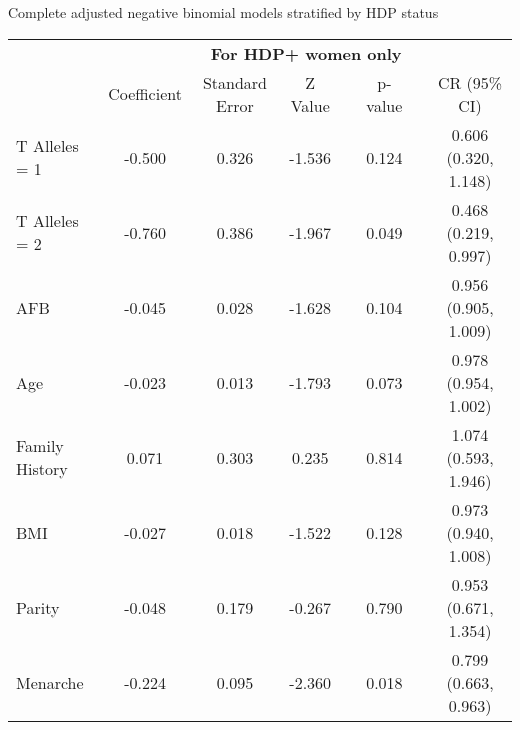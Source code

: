 \documentclass{standalone}
\begin{document}
\begin{threeparttable}
\caption{Complete adjusted negative binomial models stratified by HDP status}
\begin{tabular}{@{}lccccccc@{}}
  \toprule
  & \multicolumn{7}{c}{\textbf{For HDP+ women only}} \\
   \cmidrule{2-8}
  & Coefficient & Standard Error & Z Value & \hspace{1em} & p-value & \hspace{1em} & CR (95\% CI) \\ 
  \midrule
  T Alleles = 1\phantom{hdpxx} & -0.500 & 0.326 & -1.536 && 0.124 && 0.606 (0.320, 1.148) \\ 
  T Alleles = 2 & -0.760 & 0.386 & -1.967 && 0.049 && 0.468 (0.219, 0.997) \\ 
  AFB & -0.045 & 0.028 & -1.628 && 0.104 && 0.956 (0.905, 1.009) \\ 
  Age & -0.023 & 0.013 & -1.793 && 0.073 && 0.978 (0.954, 1.002) \\ 
  Family History & 0.071 & 0.303 & 0.235 && 0.814 && 1.074 (0.593, 1.946) \\ 
  BMI & -0.027 & 0.018 & -1.522 && 0.128 && 0.973 (0.940, 1.008) \\ 
  Parity & -0.048 & 0.179 & -0.267 && 0.790 && 0.953 (0.671, 1.354) \\ 
  Menarche & -0.224 & 0.095 & -2.360 && 0.018 && 0.799 (0.663, 0.963) \\ 
  

\end{tabular}
\end{threeparttable}
\end{document}
